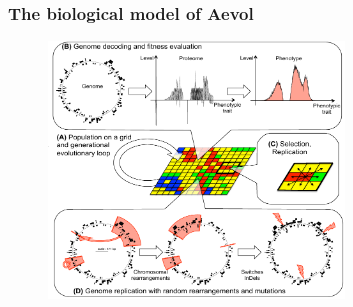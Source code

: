\documentclass{beamer}
\begin{document}
\begin{frame}
 \frametitle{The biological model of Aevol}
  \begin{figure}
        \includegraphics[width=0.7\textwidth]{figs/aevol}
\end{figure}
\end{frame}
\end{document}
